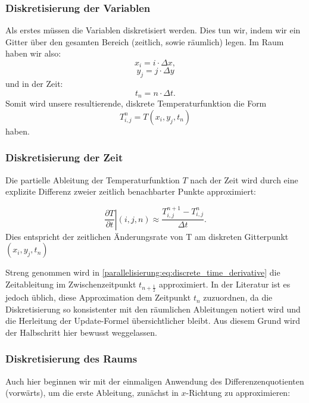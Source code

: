 \subsubsection{Diskretisierung der Variablen}

Als erstes müssen die Variablen diskretisiert werden. Dies tun wir, indem wir ein Gitter über den gesamten Bereich (zeitlich, sowie räumlich) legen. Im Raum haben wir also:
\begin{equation}
	x_i
	=
	i \cdot \Delta x,
\end{equation}
\begin{equation}
	y_j
	=
	j \cdot \Delta y
\end{equation}
und in der Zeit:
\begin{equation}
	t_n
	=
	n \cdot \Delta t.
\end{equation}
Somit wird unsere resultierende, diskrete Temperaturfunktion die Form
\begin{equation}
	T^n_{i,j}
	=
	T(x_i,y_j,t_n)
\end{equation}
haben.


\subsubsection{Diskretisierung der Zeit}

Die partielle Ableitung der Temperaturfunktion \( T \) nach der Zeit wird durch eine explizite Differenz zweier zeitlich benachbarter Punkte approximiert:

\begin{equation}
	\label{parallelisierung:eq:discrete_time_derivative}
	\left. \frac{\partial T}{\partial t}\right|{(i,j,n)}
	\approx
	\frac{T_{i,j}^{n+1} - T_{i,j}^n}{\Delta t}.
\end{equation}
Dies entspricht der zeitlichen Änderungsrate von T am diskreten Gitterpunkt \((x_i, y_j, t_n)\)

Streng genommen wird in \eqref{parallelisierung:eq:discrete_time_derivative}
die Zeitableitung im Zwischenzeitpunkt \(t_{n+\frac{1}{2}}\) approximiert. 
In der Literatur ist es jedoch üblich, diese Approximation dem Zeitpunkt \(t_n\) zuzuordnen, 
da die Diskretisierung so konsistenter mit den räumlichen Ableitungen notiert wird und die 
Herleitung der Update-Formel übersichtlicher bleibt. 
Aus diesem Grund wird der Halbschritt hier bewusst weggelassen.


\subsubsection{Diskretisierung des Raums}
Auch hier beginnen wir mit der einmaligen Anwendung des Differenzenquotienten (vorwärts), um die erste Ableitung, zunächst in $x$-Richtung zu approximieren:

